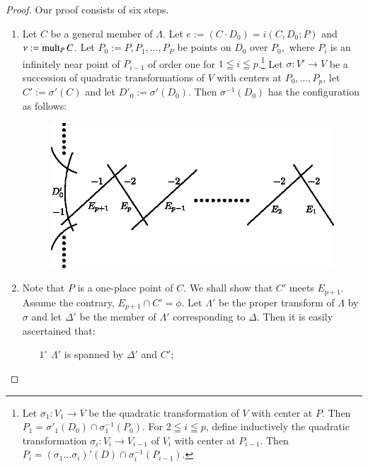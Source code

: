 \begin{proof}
Our proof consists of six steps.
\begin{enumerate}
\renewcommand{\theenumi}{\Roman{enumi}}
\renewcommand{\labelenumi}{\rm(\theenumi)}
\item Let $C$ be a general member of $\Lambda$. Let $e:=(C\cdot
  D_{0})=i(C,D_{0};P)$ and $\nu:=\operatorname{mult}_{P}C$. Let $P_{0}:=P,
  P_{1},\ldots,P_{P}$ be points on $D_{0}$ over $P_{0}$,\pageoriginale\
  where $P_{i}$ is an infinitely near point of $P_{i-1}$ of order one
  for $1\leqq i\leqq p$.\footnote{Let $\sigma_{1}:V_{1}\to V$ be the
    quadratic transformation of $V$ with center at $P$. Then
    $P_{1}=\sigma'_{1}(D_{0})\cap \sigma^{-1}_{1}(P_{0})$. For $2\leqq i
  \leqq p$, define inductively the quadratic transformation
    $\sigma_{i}:V_{i}\to V_{i-1}$ of $V_{i}$ with center at
    $P_{i-1}$. Then $P_{i}=(\sigma_{1}\ldots \sigma_{i})'(D)\cap
    \sigma^{-1}_{i}(P_{i-1})$.} Let $\sigma:V'\to V$ be a succession
  of quadratic transformations of $V$ with centers at
  $P_{0},\ldots,P_{p}$, let $C':=\sigma'(C)$ and let
  $D'_{0}:=\sigma'(D_{0})$. Then $\sigma^{-1}(D_{0})$ has the
  configuration as follows:
\begin{figure}[H]
\centering
\includegraphics[scale=1.1]{figures/chap2-fig15.eps}
\end{figure}


\item Note that $P$ is a one-place point of $C$. We shall show that
  $C'$ meets $E_{p+1}$. Assume the contrary, \iec $E_{p+1}\cap
  C'=\phi$. Let $\Lambda'$ be the proper transform of $\Lambda$ by
  $\sigma$ and let $\Delta'$ be the member of $\Lambda'$ corresponding
  to $\Delta$. Then it is easily ascertained that:
\begin{itemize}
\item[$1^{\circ}$] $\Lambda'$ is spanned by $\Delta'$ and $C'$;


\end{itemize}
\end{enumerate}
\end{proof}
